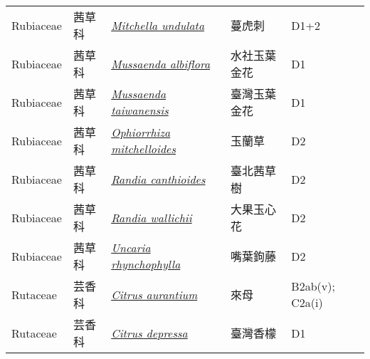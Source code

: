 {\begin{longtable}{L{2.5cm}L{2cm}L{5cm}L{2.5cm}L{3cm}}
    Rubiaceae & 茜草科 & \href{http://www.theplantlist.org/tpl1.1/search?q=Mitchella+undulata}{\textit{Mitchella undulata} } & 蔓虎刺 & D1+2    \\
    Rubiaceae & 茜草科 & \href{http://www.theplantlist.org/tpl1.1/search?q=Mussaenda+albiflora}{\textit{Mussaenda albiflora} } & 水社玉葉金花 & D1    \\
    Rubiaceae & 茜草科 & \href{http://www.theplantlist.org/tpl1.1/search?q=Mussaenda+taiwanensis}{\textit{Mussaenda taiwanensis} } & 臺灣玉葉金花 & D1    \\
    Rubiaceae & 茜草科 & \href{http://www.theplantlist.org/tpl1.1/search?q=Ophiorrhiza+mitchelloides}{\textit{Ophiorrhiza mitchelloides} } & 玉蘭草 & D2    \\
    Rubiaceae & 茜草科 & \href{http://www.theplantlist.org/tpl1.1/search?q=Randia+canthioides}{\textit{Randia canthioides} } & 臺北茜草樹 & D2    \\
    Rubiaceae & 茜草科 & \href{http://www.theplantlist.org/tpl1.1/search?q=Randia+wallichii}{\textit{Randia wallichii} } & 大果玉心花 & D2    \\
    Rubiaceae & 茜草科 & \href{http://www.theplantlist.org/tpl1.1/search?q=Uncaria+rhynchophylla}{\textit{Uncaria rhynchophylla} } & 嘴葉鉤藤 & D2    \\
    Rutaceae & 芸香科 & \href{http://www.theplantlist.org/tpl1.1/search?q=Citrus+aurantium}{\textit{Citrus aurantium} } & 來母 & B2ab(v); C2a(i)    \\
    Rutaceae & 芸香科 & \href{http://www.theplantlist.org/tpl1.1/search?q=Citrus+depressa}{\textit{Citrus depressa} } & 臺灣香檬 & D1    \\

\end{longtable}}
